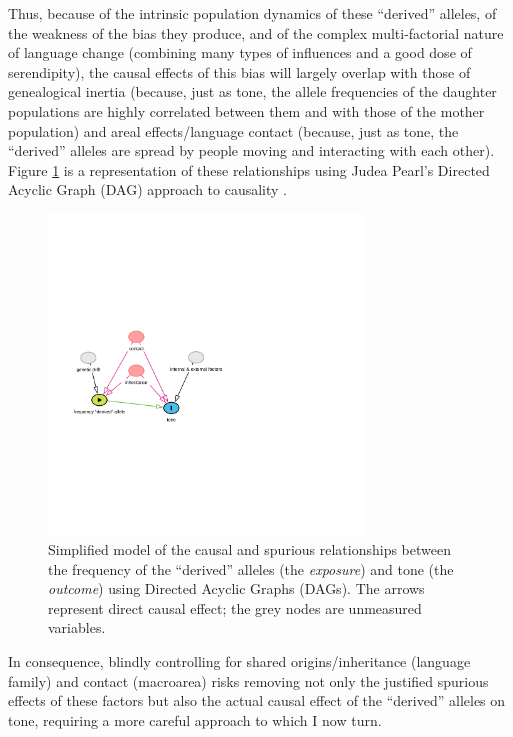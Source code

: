 \documentclass[twoside,onecolumn]{article}
\begin{document}
Thus, because of the intrinsic population dynamics of these ``derived'' alleles, of the weakness of the bias they produce, and of the complex multi-factorial nature of language change (combining many types of influences and a good dose of serendipity), the causal effects of this bias will largely overlap with those of genealogical inertia (because, just as tone, the allele frequencies of the daughter populations are highly correlated between them and with those of the mother population) and areal effects/language contact (because, just as tone, the ``derived'' alleles are spread by people moving and interacting with each other).
Figure \ref{Fig:dag_tone_genes} is a representation of these relationships using Judea Pearl's Directed Acyclic Graph (DAG) approach to causality \citep{pearl_causality_2000,pearl_why_2018,mcelreath_statistical_2020}.

\begin{figure}[h]
  \centering
  \includegraphics[width=0.75\textwidth]{dag_tone_genes}
  \caption{Simplified model of the causal and spurious relationships between the frequency of the ``derived'' alleles (the \textit{exposure}) and tone (the \textit{outcome}) using Directed Acyclic Graphs (DAGs). The arrows represent direct causal effect; the grey nodes are unmeasured variables.}
  \label{Fig:dag_tone_genes}
\end{figure}

In consequence, blindly controlling for shared origins/inheritance (language family) and contact (macroarea) risks removing not only the justified spurious effects of these factors but also the actual causal effect of the ``derived'' alleles on tone, requiring a more careful approach to which I now turn.
\end{document}
